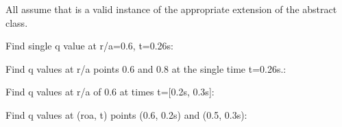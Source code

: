 \documentclass[letterpaper,10pt,english]{sphinxmanual}
\begin{document}
\begin{fulllineitems}
\begin{fulllineitems}
All assume that  is a valid instance of the appropriate
extension of the {\hyperref[\detokenize{eqtools:eqtools.core.Equilibrium}]{}} abstract class.

Find single q value at r/a=0.6, t=0.26s:

\begin{sphinxVerbatim}[commandchars=\\\{\}]
   
\end{sphinxVerbatim}

Find q values at r/a points 0.6 and 0.8 at the
single time t=0.26s.:

\begin{sphinxVerbatim}[commandchars=\\\{\}]
  \PYG{p}{[} \PYG{p}{]} 
\end{sphinxVerbatim}

Find q values at r/a of 0.6 at times t={[}0.2s, 0.3s{]}:

\begin{sphinxVerbatim}[commandchars=\\\{\}]
   \PYG{p}{[} \PYG{p}{]}
\end{sphinxVerbatim}

Find q values at (roa, t) points (0.6, 0.2s) and (0.5, 0.3s):

\begin{sphinxVerbatim}[commandchars=\\\{\}]
  \PYG{p}{[} \PYG{p}{]} \PYG{p}{[} \PYG{p}{]} 
\end{sphinxVerbatim}

\end{fulllineitems}



\end{fulllineitems}
\end{document}
